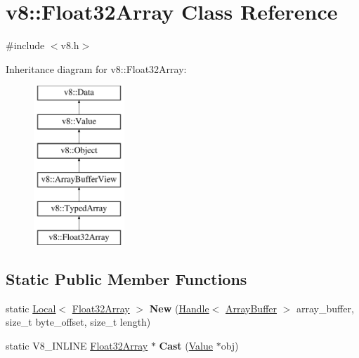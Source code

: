 \hypertarget{classv8_1_1Float32Array}{\section{v8\-:\-:Float32\-Array Class Reference}
\label{classv8_1_1Float32Array}
}


{\ttfamily \#include $<$v8.\-h$>$}

Inheritance diagram for v8\-:\-:Float32\-Array\-:\begin{figure}[H]
\begin{center}
\leavevmode
\includegraphics[height=6.000000cm]{classv8_1_1Float32Array}
\end{center}
\end{figure}
\subsection*{Static Public Member Functions}
\begin{DoxyCompactItemize}
\item 
\hypertarget{classv8_1_1Float32Array_a6fea1d1987ec9abce97060900d5fc4af}{static \hyperlink{classv8_1_1Local}{Local}$<$ \hyperlink{classv8_1_1Float32Array}{Float32\-Array} $>$ {\bfseries New} (\hyperlink{classv8_1_1Handle}{Handle}$<$ \hyperlink{classv8_1_1ArrayBuffer}{Array\-Buffer} $>$ array\-\_\-buffer, size\-\_\-t byte\-\_\-offset, size\-\_\-t length)}\label{classv8_1_1Float32Array_a6fea1d1987ec9abce97060900d5fc4af}

\item 
\hypertarget{classv8_1_1Float32Array_adf926d03cacd4b3901d7f9750671a350}{static V8\-\_\-\-I\-N\-L\-I\-N\-E \hyperlink{classv8_1_1Float32Array}{Float32\-Array} $\ast$ {\bfseries Cast} (\hyperlink{classv8_1_1Value}{Value} $\ast$obj)}\label{classv8_1_1Float32Array_adf926d03cacd4b3901d7f9750671a350}

\end{DoxyCompactItemize}
